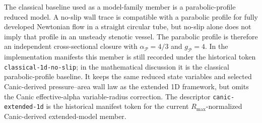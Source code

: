 \begin{definition}
    \label{def:classical-no-slip-1d-baseline}
    The classical baseline used as a model-family member is a
    parabolic-profile reduced model. A no-slip wall trace is compatible with a
    parabolic profile for fully developed Newtonian flow in a straight circular
    tube, but no-slip alone does not imply that profile in an unsteady stenotic
    vessel. The parabolic profile is therefore an independent cross-sectional
    closure with $\alpha_{\mathcal P}=4/3$ and $g_{\mathcal P}=4$. In the
    implementation manifests this member is still recorded under the historical
    token \texttt{classical-1d-no-slip}; in the mathematical discussion it is
    the classical parabolic-profile baseline. It keeps the same reduced state
    variables and selected Canic-derived pressure--area wall law as the
    extended 1D framework, but omits the Canic effective-alpha variable-radius
    correction. The descriptor \texttt{canic-extended-1d} is the historical
    manifest token for the current $R_{\max}$-normalized Canic-derived
    extended-model member.
\end{definition}

